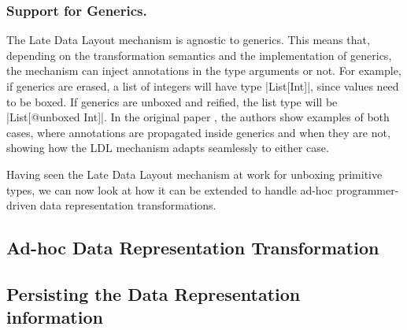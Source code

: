 \subsubsection{Support for Generics.}
The Late Data Layout mechanism is agnostic to generics. This means that, depending on the transformation semantics and the implementation of generics, the mechanism can inject annotations in the type arguments or not. For example, if generics are erased, a list of integers will have type |List[Int]|, since values need to be boxed. If generics are unboxed and reified, the list type will be |List[@unboxed Int]|. In the original paper \cite{ldl}, the authors show examples of both cases, where annotations are propagated inside generics and when they are not, showing how the LDL mechanism adapts seamlessly to either case.

Having seen the Late Data Layout mechanism at work for unboxing primitive types, we can now look at how it can be extended to handle ad-hoc programmer-driven data representation transformations.

\subsection{Ad-hoc Data Representation Transformation}


%
%

\subsection{Persisting the Data Representation information}
\label{sec:ildl:signatures}

